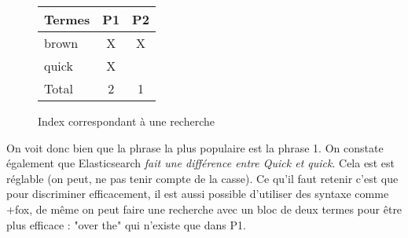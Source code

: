\begin{figure}[H]
\center
\begin{tabular}{|l||c|c|}
\hline
\textbf{Termes}   & \textbf{P1}    & \textbf{P2}\\ \hline  
brown   &   X   &  X\\ \hline
quick   &   X   &   \\ \hline \hline
Total   &   2   &  1 \\ \hline
\end{tabular}
\caption{Index correspondant à une recherche}
\end{figure}

On voit donc bien que la phrase la plus populaire est la phrase 1. On constate également
que Elasticsearch \emph{fait une différence entre \emph{Quick} et \emph{quick}}. 
Cela est est réglable (on peut, ne pas tenir compte de la casse).
Ce qu'il faut retenir c'est que pour discriminer efficacement, il est aussi possible
d'utiliser des syntaxe comme +fox, de même on peut faire une recherche avec un bloc
de deux termes pour être plus efficace : "over the" qui n'existe que dans P1.


